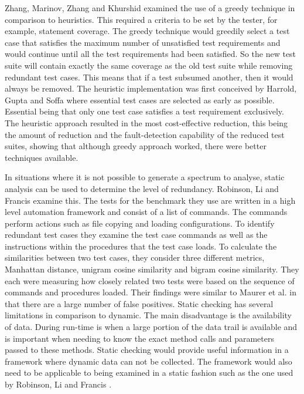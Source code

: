 Zhang, Marinov, Zhang and Khurshid \cite{zhang2011empirical} examined the use of a greedy technique in comparison to heuristics. This required a criteria to be set by the tester, for example, statement coverage. The greedy technique would greedily select a test case that satisfies the maximum number of unsatisfied test requirements and would continue until all the test requirements had been satisfied. So the new test suite will contain exactly the same coverage as the old test suite while removing redundant test cases. This means that if a test subsumed another, then it would always be removed. The heuristic implementation was first conceived by Harrold, Gupta and Soffa \cite{harrold1993methodology} where essential test cases are selected as early as possible. Essential being that only one test case satisfies a test requirement exclusively. The heuristic approach resulted in the most cost-effective reduction, this being the amount of reduction and the fault-detection capability of the reduced test suites, showing that although greedy approach worked, there were better techniques available.

In situations where it is not possible to generate a spectrum to analyse, static analysis can be used to determine the level of redundancy. Robinson, Li and Francis \cite{li2008static} examine this. The tests for the benchmark they use are written in a high level automation framework and consist of a list of commands. The commands perform actions such as file copying and loading configurations. To identify redundant test cases they examine the test case commands as well as the instructions within the procedures that the test case loads. To calculate the similarities between two test cases, they consider three different metrics, Manhattan distance, unigram cosine similarity and bigram cosine similarity. They each were measuring how closely related two tests were based on the sequence of commands and procedures loaded. Their findings were similar to Maurer et al. \cite{koochakzadeh2009test} in that there are a large number of false positives. Static checking has several limitations in comparison to dynamic. The main disadvantage is the availability of data. During run-time is when a large portion of the data trail is available and is important when needing to know the exact method calls and parameters passed to these methods. Static checking would provide useful information in a framework where dynamic data can not be collected. The framework would also need to be applicable to being examined in a static fashion such as the one used by Robinson, Li and Francis \cite{li2008static}.

